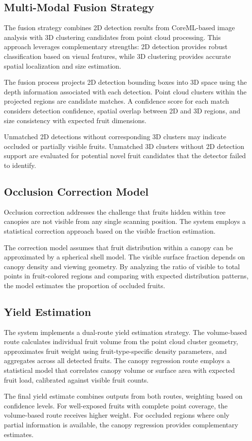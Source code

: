 \subsection{Multi-Modal Fusion Strategy}
The fusion strategy combines 2D detection results from CoreML-based image analysis with 3D clustering candidates from point cloud processing. This approach leverages complementary strengths: 2D detection provides robust classification based on visual features, while 3D clustering provides accurate spatial localization and size estimation.

The fusion process projects 2D detection bounding boxes into 3D space using the depth information associated with each detection. Point cloud clusters within the projected regions are candidate matches. A confidence score for each match considers detection confidence, spatial overlap between 2D and 3D regions, and size consistency with expected fruit dimensions.

Unmatched 2D detections without corresponding 3D clusters may indicate occluded or partially visible fruits. Unmatched 3D clusters without 2D detection support are evaluated for potential novel fruit candidates that the detector failed to identify.

\subsection{Occlusion Correction Model}
Occlusion correction addresses the challenge that fruits hidden within tree canopies are not visible from any single scanning position. The system employs a statistical correction approach based on the visible fraction estimation.

The correction model assumes that fruit distribution within a canopy can be approximated by a spherical shell model. The visible surface fraction depends on canopy density and viewing geometry. By analyzing the ratio of visible to total points in fruit-colored regions and comparing with expected distribution patterns, the model estimates the proportion of occluded fruits.

\subsection{Yield Estimation}
The system implements a dual-route yield estimation strategy. The volume-based route calculates individual fruit volume from the point cloud cluster geometry, approximates fruit weight using fruit-type-specific density parameters, and aggregates across all detected fruits. The canopy regression route employs a statistical model that correlates canopy volume or surface area with expected fruit load, calibrated against visible fruit counts.

The final yield estimate combines outputs from both routes, weighting based on confidence levels. For well-exposed fruits with complete point coverage, the volume-based route receives higher weight. For occluded regions where only partial information is available, the canopy regression provides complementary estimates.